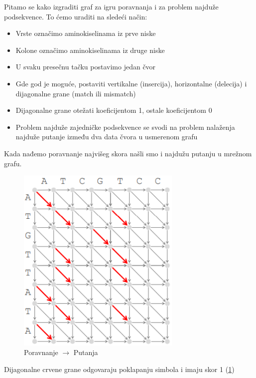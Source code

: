 Pitamo se kako izgraditi graf za igru poravnanja i za problem najduže podsekvence. To ćemo uraditi na sledeći način:

\begin{itemize}
    \item Vrste označimo aminokiselinama iz prve niske
    \item Kolone označimo aminokiselinama iz druge niske
    \item U svaku presečnu tačku postavimo jedan čvor
    \item Gde god je moguće, postaviti vertikalne (insercija), horizontalne (delecija) i dijagonalne grane (match ili mismatch)
    \item Dijagonalne grane otežati koeficijentom 1, ostale koeficijentom 0
    \item Problem najduže zajedničke podsekvence se svodi na problem nalaženja najduže putanje između dva data čvora u usmerenom grafu
\end{itemize}

Kada nađemo poravnanje najvišeg skora našli smo i najdužu putanju u mrežnom grafu.

\begin{figure}[h!]
\centering
\includegraphics[width=0.7\textwidth]{poglavlja/5/slike/poravnanje1.png}
\caption{Poravnanje $\rightarrow$ Putanja}
\label{slika:poravnanje2}
\end{figure}

Dijagonalne crvene grane odgovaraju poklapanju simbola i imaju skor 1 (\ref{slika:poravnanje2})

